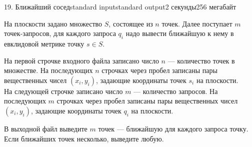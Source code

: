 \begin{problem}{19. Ближайший сосед}{standard input}{standard output}{2 секунды}{256 мегабайт}

На плоскости задано множество $S$, состоящее из $n$ точек. Далее поступает $m$ точек-запросов, для каждого запроса $q_i$ надо вывести ближайшую к нему в евклидовой метрике точку $s \in S$.

\InputFile

На первой строчке входного файла записано число $n$ — количество точек в множестве. На последующих $n$ строчках через пробел записаны пары вещественных чисел $(x_i, y_i)$, задающие координаты точек $s_i$ на плоскости. \\
На следующей строчке записано число $m$ — количество запросов. На последующих $m$ строчках через пробел записаны пары вещественных чисел $(x_i, y_i)$, задающие координаты точек $q_i$ на плоскости. 

\OutputFile
В выходной файл выведите $m$ точек — ближайшую для каждого запроса точку. Если ближайших точек несколько, выведите любую.

\Examples

\begin{example}%
%
\end{example}

\begin{example}
%
\end{example}

\end{problem}
